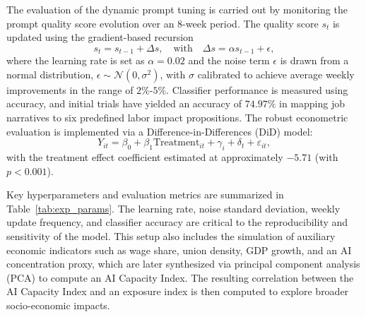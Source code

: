 \documentclass{article} %
\begin{document}
The evaluation of the dynamic prompt tuning is carried out by monitoring the prompt quality score evolution over an 8-week period. The quality score \( s_t \) is updated using the gradient-based recursion
\[
s_t = s_{t-1} + \Delta s, \quad \text{with} \quad \Delta s = \alpha s_{t-1} + \epsilon,
\]
where the learning rate is set as \( \alpha = 0.02 \) and the noise term \( \epsilon \) is drawn from a normal distribution, \( \epsilon \sim \mathcal{N}(0, \sigma^2) \), with \(\sigma\) calibrated to achieve average weekly improvements in the range of \(2\%\)-\(5\%\). Classifier performance is measured using accuracy, and initial trials have yielded an accuracy of \(74.97\%\) in mapping job narratives to six predefined labor impact propositions. The robust econometric evaluation is implemented via a Difference-in-Differences (DiD) model:
\[
Y_{it} = \beta_0 + \beta_1 \text{Treatment}_{it} + \gamma_i + \delta_t + \varepsilon_{it},
\]
with the treatment effect coefficient estimated at approximately \(-5.71\) (with \( p < 0.001 \)).

Key hyperparameters and evaluation metrics are summarized in Table~\ref{tab:exp_params}. The learning rate, noise standard deviation, weekly update frequency, and classifier accuracy are critical to the reproducibility and sensitivity of the model. This setup also includes the simulation of auxiliary economic indicators such as wage share, union density, GDP growth, and an AI concentration proxy, which are later synthesized via principal component analysis (PCA) to compute an AI Capacity Index. The resulting correlation between the AI Capacity Index and an exposure index is then computed to explore broader socio-economic impacts.

\begin{table}[h]
\centering
{}
\caption{Key hyperparameters and evaluation metrics for the experimental setup.}
\label{tab:exp_params}
\end{table}
\end{document}
